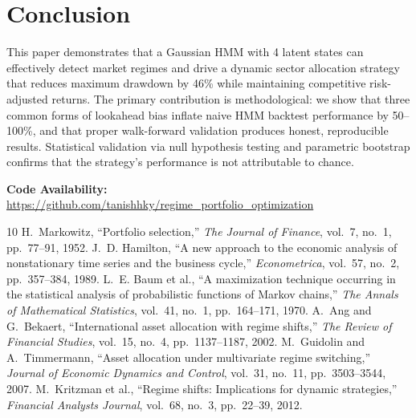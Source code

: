 \documentclass[11pt]{article}
\begin{document}
\section{Conclusion}

This paper demonstrates that a Gaussian HMM with 4 latent states can effectively detect market regimes and drive a dynamic sector allocation strategy that reduces maximum drawdown by 46\% while maintaining competitive risk-adjusted returns. The primary contribution is methodological: we show that three common forms of lookahead bias inflate naive HMM backtest performance by 50--100\%, and that proper walk-forward validation produces honest, reproducible results. Statistical validation via null hypothesis testing and parametric bootstrap confirms that the strategy's performance is not attributable to chance.

\medskip
\noindent\textbf{Code Availability:} \url{https://github.com/tanishhky/regime_portfolio_optimization}

\begin{thebibliography}{10}
 H.~Markowitz, ``Portfolio selection,'' \textit{The Journal of Finance}, vol.~7, no.~1, pp.~77--91, 1952.
 J.~D. Hamilton, ``A new approach to the economic analysis of nonstationary time series and the business cycle,'' \textit{Econometrica}, vol.~57, no.~2, pp.~357--384, 1989.
 L.~E. Baum et al., ``A maximization technique occurring in the statistical analysis of probabilistic functions of Markov chains,'' \textit{The Annals of Mathematical Statistics}, vol.~41, no.~1, pp.~164--171, 1970.
 A.~Ang and G.~Bekaert, ``International asset allocation with regime shifts,'' \textit{The Review of Financial Studies}, vol.~15, no.~4, pp.~1137--1187, 2002.
 M.~Guidolin and A.~Timmermann, ``Asset allocation under multivariate regime switching,'' \textit{Journal of Economic Dynamics and Control}, vol.~31, no.~11, pp.~3503--3544, 2007.
 M.~Kritzman et al., ``Regime shifts: Implications for dynamic strategies,'' \textit{Financial Analysts Journal}, vol.~68, no.~3, pp.~22--39, 2012.
\end{thebibliography}
\end{document}
